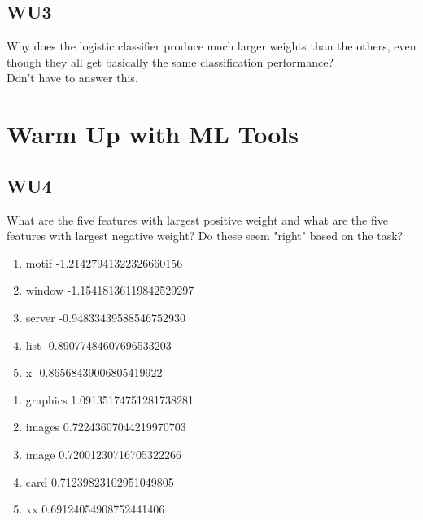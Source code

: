 \documentclass[a4paper,11pt]{article}
\begin{document}
\subsection{WU3}
\textsf{Why does the logistic classifier produce much larger weights
  than the others, even though they all get basically the same
  classification performance?}\\ Don't have to answer this.

\section{Warm Up with ML Tools}
\label{sec:warmup}
\subsection{WU4}
\textsf{What are the five features with largest positive weight and what
are the five features with largest negative weight? Do these seem "right"
based on the task?}\\

\begin{enumerate}
 \item motif -1.21427941322326660156
 \item window -1.15418136119842529297
 \item server -0.94833439588546752930
 \item list -0.89077484607696533203
 \item x -0.86568439006805419922
\end{enumerate}

\begin{enumerate}
 \item graphics 1.09135174751281738281
 \item images 0.72243607044219970703
 \item image 0.72001230716705322266
 \item card 0.71239823102951049805
 \item xx 0.69124054908752441406
\end{enumerate}
\end{document}
